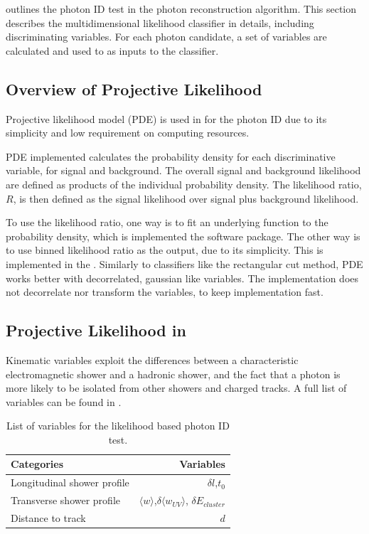  outlines the photon ID test in the photon reconstruction algorithm. This section describes the multidimensional likelihood classifier in details, including discriminating variables. For each photon candidate, a set of variables are calculated and used to as inputs to the classifier.

\subsection{Overview of Projective Likelihood}
\label{sec:photonPDE}
Projective likelihood model (PDE) is used in \pandora for the photon ID due to its simplicity and low requirement on computing resources.

PDE implemented calculates the probability density for each discriminative variable, for signal and background. The overall signal and background likelihood are defined as products of the individual probability density. The likelihood ratio, $R$, is then defined as the signal likelihood over signal plus background likelihood.

To use the likelihood ratio, one way is to fit an underlying function to the probability density, which is implemented the \TMVA software package. The other way is to use binned likelihood ratio as the output, due to its simplicity. This is implemented in the \pandora. Similarly to classifiers like the rectangular cut method, PDE works better with decorrelated, gaussian like variables. The \pandora implementation does not decorrelate nor transform the variables, to keep implementation fast.

\subsection{Projective Likelihood in \pandora}

Kinematic variables exploit the differences between a characteristic electromagnetic shower and a hadronic shower, and the fact that a photon is more likely to be isolated from other showers and charged tracks. A full list of variables can be found in .

\begin{table}[htbp] \centering \smallskip
\begin{tabular}{l r }
\hline
\hline
Categories&  Variables\\
\hline
Longitudinal shower profile & $\delta{l}$,$t_0$ \\
Transverse shower profile & $\langle{w}\rangle$,$\delta{\langle{w_{UV}}\rangle}$, $\delta E_{cluster}$ \\
Distance to track &  $d$ \\
\hline
\hline
\end{tabular}
\caption
{List of variables for the likelihood based photon ID test.}
\label{tab:photonPhotonIDvar}
\end{table}

